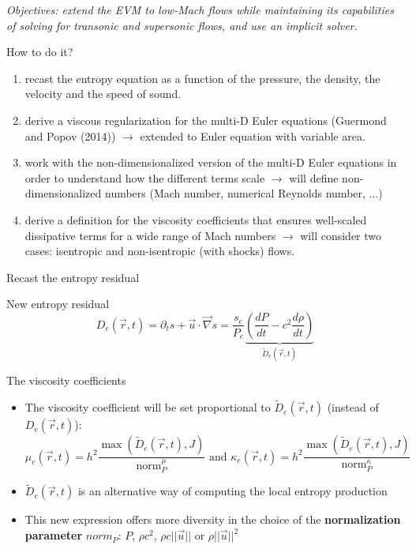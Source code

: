 \documentclass[xcolor=dvipsnames,10pt]{beamer}
\newcommand{\grad}{\vec{\nabla}}
\newcommand{\norm}{\textrm{norm}}
\begin{document}
\begin{frame}
\emph{Objectives: extend the EVM to low-Mach flows while maintaining its capabilities of solving for transonic and supersonic flows, and use an implicit solver.}
\begin{block}{How to do it?}
\begin{enumerate}
\setlength{\itemsep}{10pt}
\item recast the entropy equation as a function of the pressure, the density, the velocity and the speed of sound.
\item derive a viscous regularization for the multi-D Euler equations (Guermond and Popov (2014)) $\rightarrow$ extended to Euler equation with variable area.
\item work with the non-dimensionalized version of the multi-D Euler equations in order to understand how the different terms scale $\to$ will define non-dimensionalized numbers (Mach number, numerical Reynolds number, $\dots$)
\item derive a definition for the viscosity coefficients that ensures well-scaled dissipative terms for a wide range of Mach numbers $\to$ will consider two cases: isentropic and non-isentropic (with shocks) flows.
\end{enumerate}
\end{block}
\end{frame}
\begin{frame}{Recast the entropy residual}
\begin{block}{New entropy residual}
\begin{equation}
D_e(\vec{r},t) = \partial_t s + \vec{u} \cdot \grad s = \frac{s_e}{P_e} \underbrace{\left( \frac{d P}{dt} - c^2 \frac{d \rho}{dt} \right)}_{\tilde{D}_e(\vec{r},t)} \nonumber
\end{equation}
\end{block}
\begin{block}{The viscosity coefficients}
\begin{itemize}
\item The viscosity coefficient will be set proportional to $\tilde{D}_e(\vec{r},t)$ (instead of $D_e(\vec{r},t)$):
\begin{equation}
\mu_e(\vec{r},t) = h^2 \frac{\max \left( \tilde{D}_e(\vec{r},t), J \right)}{\norm_P^\mu} \text{ and }\kappa_e(\vec{r},t) = h^2 \frac{\max \left( \tilde{D}_e(\vec{r},t), J \right)}{\norm_P^\kappa} \nonumber
\end{equation}
\item $\tilde{D}_e(\vec{r},t)$ is an alternative way of computing the local entropy production
\item This new expression offers more diversity in the choice of the \textbf{normalization parameter} $norm_P$: $P$, $\rho c^2$, $\rho c ||\vec{u} ||$ or  $\rho ||\vec{u}||^2$
\end{itemize}
\end{block}
\end{frame}
\end{document}
